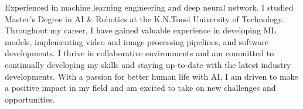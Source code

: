 


\justifying
Experienced in machine learning engineering and deep neural network. I studied Master's Degree in AI \& Robotics at the K.N.Toosi University of Technology. Throughout my career, I have gained valuable experience in developing ML models, implementing video and image processing pipelines, and software developments. I thrive in collaborative environments and am committed to continually developing my skills and staying up-to-date with the latest industry developments. With a passion for better human life with AI, I am driven to make a positive impact in my field and am excited to take on new challenges and opportunities. 


